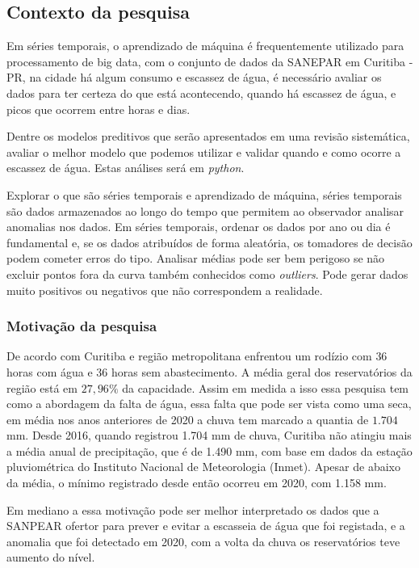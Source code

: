 \subsection{Contexto da pesquisa} \label{subsec:contexto}
 Em séries temporais, o aprendizado de máquina é frequentemente utilizado para processamento de big data, com o conjunto de dados da SANEPAR em Curitiba - PR, na cidade há algum consumo e escassez de água, é necessário avaliar os dados para ter certeza do que está acontecendo, quando há escassez de água, e picos que ocorrem entre horas e dias.
 
 Dentre os modelos preditivos que serão apresentados em uma revisão sistemática, avaliar o melhor modelo que podemos utilizar e validar quando e como ocorre a escassez de água. Estas análises será em \textit{python}.
 
 Explorar o que são séries temporais e aprendizado de máquina, séries temporais são dados armazenados ao longo do tempo que permitem ao observador analisar anomalias nos dados. Em séries temporais, ordenar os dados por ano ou dia é fundamental e, se os dados atribuídos de forma aleatória, os tomadores de decisão podem cometer erros do tipo. 
 Analisar médias pode ser bem perigoso se não excluir pontos fora da curva também conhecidos como \textit{outliers}. Pode gerar dados muito positivos ou negativos que não correspondem a realidade.
   
      
\subsubsection{Motivação da pesquisa} \label{subsubsec:motivacao}
    
    De acordo com \cite{vasconcelos_2020} Curitiba e região metropolitana enfrentou um rodízio com $36$ horas com água e $36$ horas sem abastecimento. A média geral dos reservatórios da região está em $27,96\%$ da capacidade. Assim em medida a isso essa pesquisa tem como a abordagem da falta de água, essa falta que pode ser vista como uma seca, em média nos anos anteriores de 2020 a chuva tem marcado a quantia de $1.704$ mm. \cite{vasconcelos_2020} Desde 2016, quando registrou 1.704 mm de chuva, Curitiba não atingiu mais a média anual de precipitação, que é de 1.490 mm, com base em dados da estação pluviométrica do Instituto Nacional de Meteorologia (Inmet).  Apesar de abaixo da média, o mínimo registrado desde então ocorreu em 2020, com 1.158 mm.
    
    Em mediano a essa motivação pode ser melhor interpretado os dados que a SANPEAR ofertor para prever e evitar a escasseia de água que foi registada, e a anomalia que foi detectado em 2020, com a volta da chuva os reservatórios teve aumento do nível.
    